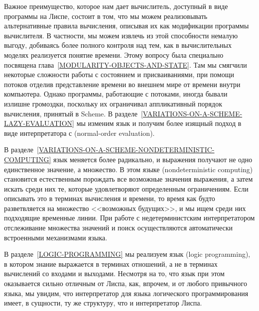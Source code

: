 Важное преимущество, которое нам дает вычислитель, доступный в виде
программы на Лиспе, состоит в том, что мы можем реализовывать
альтернативные правила вычисления, описывая их как модификации
программы вычислителя.  В частности, мы можем извлечь из этой
способности немалую выгоду, добиваясь более полного контроля над тем, как
в вычислительных моделях реализуется понятие времени. Этому вопросу была
специально посвящена глава~\ref{MODULARITY-OBJECTS-AND-STATE}.  Там мы смягчили
некоторые сложности работы с состоянием и присваиваниями, при помощи
потоков отделив представление времени во внешнем мире от времени
внутри компьютера.  Однако программы, работающие с потоками, иногда
бывали излишне громоздки, поскольку их ограничивал аппликативный порядок
вычисления, принятый в Scheme.  В 
разделе~\ref{VARIATIONS-ON-A-SCHEME-LAZY-EVALUATION} мы изменим
язык и получим более изящный подход в виде интерпретатора с 
 (normal-order 
evaluation).

В разделе~\ref{VARIATIONS-ON-A-SCHEME-NONDETERMINISTIC-COMPUTING}
язык меняется более радикально, и выражения получают
не одно единственное значение, а множество.  В этом языке 
 (nondeterministic computing) становится естественным порождать 
все возможные значения выражения, а затем искать среди них те, которые 
удовлетворяют определенным ограничениям.  Если описывать это в терминах
вычисления и времени, то время как будто
разветвляется на множество <<возможных будущих>>, и мы ищем среди них
подходящие временные линии.  При работе с недетерминистским интерпретатором
отслеживание множества значений и поиск осуществляются автоматически
встроенными механизмами языка.

В разделе~\ref{LOGIC-PROGRAMMING} мы реализуем язык
 (logic programming), в котором знание выражается в терминах
отношений, а не в терминах вычислений со входами и выходами.  Несмотря
на то, что язык при этом оказывается сильно отличным от Лиспа, как,
впрочем, и от любого привычного языка, мы увидим, что интерпретатор
для языка логического программирования имеет, в сущности, ту же
структуру, что и интерпретатор Лиспа.

